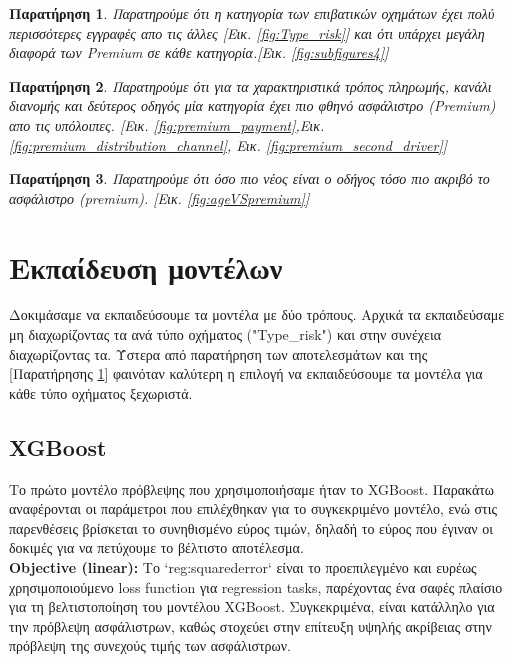 \documentclass{llncs}
\newtheorem{observation}{Παρατήρηση}
\begin{document}
\begin{observation}
    \label{observation:first}
    Παρατηρούμε ότι η κατηγορία των επιβατικών οχημάτων έχει πολύ περισσότερες εγγραφές απο τις άλλες
    [Εικ. \ref{fig:Type_risk}] 
    και ότι υπάρχει μεγάλη διαφορά των Premium σε κάθε κατηγορία.[Εικ. \ref{fig:subfigures4}]
\end{observation}

\begin{observation}
    \label{observation:second}
    Παρατηρούμε ότι για τα χαρακτηριστικά τρόπος πληρωμής, κανάλι διανομής και δεύτερος οδηγός
    μία κατηγορία έχει πιο φθηνό ασφάλιστρο (Premium) απο τις υπόλοιπες.
    [Εικ. \ref{fig:premium_payment},Εικ. \ref{fig:premium_distribution_channel},
    Εικ. \ref{fig:premium_second_driver}]
\end{observation}

\begin{observation}
    \label{observation:third}
    Παρατηρούμε ότι όσο πιο νέος είναι ο οδήγος τόσο πιο ακριβό το ασφάλιστρο (premium). [Εικ. \ref{fig:ageVSpremium}]
\end{observation}


\section{Εκπαίδευση μοντέλων}
Δοκιμάσαμε να εκπαιδεύσουμε τα μοντέλα με δύο τρόπους. Αρχικά τα εκπαιδεύσαμε 
μη διαχωρίζοντας τα ανά τύπο οχήματος ("Type\_risk") και στην συνέχεια διαχωρίζοντας τα.
Ύστερα από παρατήρηση των αποτελεσμάτων και της
[Παρατήρησης \ref{observation:first}] φαινόταν καλύτερη η επιλογή 
να εκπαιδεύσουμε τα μοντέλα για κάθε τύπο οχήματος ξεχωριστά.

\subsection{XGBoost}
Το πρώτο μοντέλο πρόβλεψης που χρησιμοποιήσαμε ήταν το XGBoost. Παρακάτω αναφέρονται οι παράμετροι που επιλέχθηκαν για το συγκεκριμένο μοντέλο, ενώ στις παρενθέσεις βρίσκεται το συνηθισμένο εύρος τιμών, δηλαδή το εύρος που έγιναν οι δοκιμές για να πετύχουμε το βέλτιστο αποτέλεσμα.\\

\noindent \textbf{Objective (linear):}
Το `reg:squarederror` είναι το προεπιλεγμένο και ευρέως χρησιμοποιούμενο loss function για regression tasks, παρέχοντας ένα σαφές πλαίσιο για τη βελτιστοποίηση του μοντέλου XGBoost. Συγκεκριμένα, είναι κατάλληλο για την πρόβλεψη ασφάλιστρων, καθώς στοχεύει στην επίτευξη υψηλής ακρίβειας στην πρόβλεψη της συνεχούς τιμής των ασφάλιστρων. \\
\end{document}
